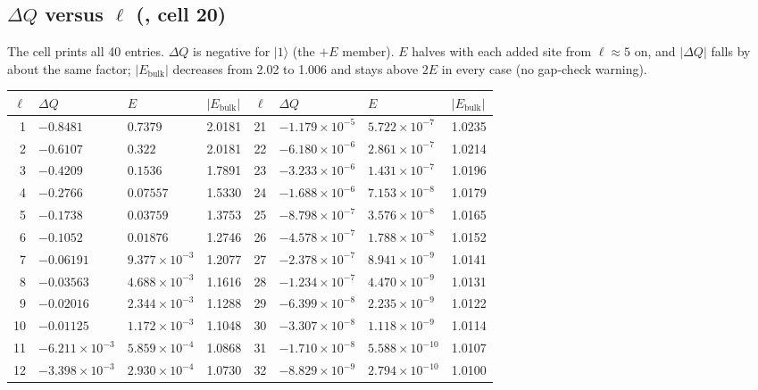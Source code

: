 \documentclass[11pt]{article}
\newcommand{\ket}[1]{\lvert #1\rangle}
\begin{document}
\subsection{\texorpdfstring{$\Delta Q$ versus $\ell$ (, cell 20)}{Delta Q versus l (charge\_difference, cell 20)}}
The cell prints all 40 entries. $\Delta Q$ is negative for $\ket{1}$ (the
$+E$ member). $E$ halves with each added site from $\ell\approx5$ on, and $|\Delta Q|$ falls by about the same factor;
$|E_{\text{bulk}}|$ decreases from 2.02 to
1.006 and stays above $2E$ in every case (no gap-check warning).
\begin{center}\small
\begin{tabular}{@{}rlll@{\qquad}rlll@{}}
\toprule
$\ell$ & $\Delta Q$ & $E$ & $|E_{\text{bulk}}|$ & $\ell$ & $\Delta Q$ & $E$ & $|E_{\text{bulk}}|$\\
\midrule
1 & $-0.8481$ & $0.7379$ & 2.0181 & 21 & $-1.179\times10^{-5}$ & $5.722\times10^{-7}$ & 1.0235 \\
2 & $-0.6107$ & $0.322$ & 2.0181 & 22 & $-6.180\times10^{-6}$ & $2.861\times10^{-7}$ & 1.0214 \\
3 & $-0.4209$ & $0.1536$ & 1.7891 & 23 & $-3.233\times10^{-6}$ & $1.431\times10^{-7}$ & 1.0196 \\
4 & $-0.2766$ & $0.07557$ & 1.5330 & 24 & $-1.688\times10^{-6}$ & $7.153\times10^{-8}$ & 1.0179 \\
5 & $-0.1738$ & $0.03759$ & 1.3753 & 25 & $-8.798\times10^{-7}$ & $3.576\times10^{-8}$ & 1.0165 \\
6 & $-0.1052$ & $0.01876$ & 1.2746 & 26 & $-4.578\times10^{-7}$ & $1.788\times10^{-8}$ & 1.0152 \\
7 & $-0.06191$ & $9.377\times10^{-3}$ & 1.2077 & 27 & $-2.378\times10^{-7}$ & $8.941\times10^{-9}$ & 1.0141 \\
8 & $-0.03563$ & $4.688\times10^{-3}$ & 1.1616 & 28 & $-1.234\times10^{-7}$ & $4.470\times10^{-9}$ & 1.0131 \\
9 & $-0.02016$ & $2.344\times10^{-3}$ & 1.1288 & 29 & $-6.399\times10^{-8}$ & $2.235\times10^{-9}$ & 1.0122 \\
10 & $-0.01125$ & $1.172\times10^{-3}$ & 1.1048 & 30 & $-3.307\times10^{-8}$ & $1.118\times10^{-9}$ & 1.0114 \\
11 & $-6.211\times10^{-3}$ & $5.859\times10^{-4}$ & 1.0868 & 31 & $-1.710\times10^{-8}$ & $5.588\times10^{-10}$ & 1.0107 \\
12 & $-3.398\times10^{-3}$ & $2.930\times10^{-4}$ & 1.0730 & 32 & $-8.829\times10^{-9}$ & $2.794\times10^{-10}$ & 1.0100 \\

\end{tabular}
\end{center}
\end{document}
